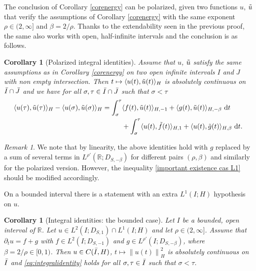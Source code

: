 \documentclass[11pt, letterpaper]{amsart}
\newtheorem{cor}[thm]{Corollary}
\theoremstyle{definition}
\theoremstyle{remark}
\newtheorem{rem}[thm]{Remark}
\numberwithin{equation}{section}
\begin{document}
{The conclusion of Corollary \ref{corenergy} can be polarized, given two functions $u$, $\Tilde{u}$ that verify the assumptions of Corollary \ref{corenergy} with the same exponent $\rho \in (2,\infty]$ and $\beta = 2/\rho$. Thanks to the extendability seen in the previous proof, the same also works with open, half-infinite intervals and the conclusion is as follows.
\begin{cor}[Polarized integral identities]\label{EnergyPol}
    Assume that $u$, $\Tilde{u}$ satisfy the same assumptions as in Corollary \ref{corenergy} on two open infinite intervals $I$ and $J$ with non empty intersection. Then $t \mapsto \langle u(t), \Tilde{u}(t) \rangle_H$ is absolutely continuous on $\Bar{I}\cap \Bar{J}$ and  we have for all $ \sigma, \tau \in \Bar{I}\cap \Bar{J}$ such that $  \sigma < \tau$
    \begin{align*}
        \langle u(\tau), \Tilde{u}(\tau) \rangle_H - \langle u(\sigma), \Tilde{u}(\sigma) \rangle_H =\int_{\sigma}^{\tau} &\langle f(t),\Tilde{u}(t)\rangle_{H,-1} + \langle g(t),\Tilde{u}(t)\rangle_{H,-{\beta}}\ \mathrm d t \\&+ \int_{\sigma}^{\tau} \langle u(t),\Tilde{f}(t)\rangle_{H,1} + \langle u(t), \Tilde{g}(t)\rangle_{H,{\beta}}\ \mathrm d t.
    \end{align*}
\end{cor} 

\begin{rem}
We note that by linearity, the above identities hold with $g$ replaced by a sum of several terms in $L^{\rho'}(\mathbb{R};D_{S,-{\beta}})$ for different pairs $(\rho,\beta)$ and similarly for the polarized version. However, the inequality \eqref{important existence cas L1} should be modified accordingly.
\end{rem}

On a bounded interval there is a statement with  an extra  $L^1(I;H)$ hypothesis on $u$.

\begin{cor}[Integral identities: the bounded case]\label{corenergybounded}
    Let $I$ be a  bounded, open interval of $\mathbb{R}$. Let $u \in L^2(I;D_{S,1})\cap L^1(I;H)$ and let $\rho \in (2,\infty]$. Assume that $\partial_t u =  f+g$ with $f \in L^2(I;D_{S,-1})$ and 
     $g \in L^{\rho'}(I;D_{S,-{\beta}})$, where ${\beta}={2}/{\rho} \in [0,1)$. Then $ u \in C(\Bar{I},H)$, $ t \mapsto \left \| u(t) \right \|^2_H$ is absolutely continuous on $\Bar{I}$ and \eqref{eq:integralidentity} holds for all $ \sigma, \tau \in \Bar{I}$ such that $  \sigma < \tau$.
\end{cor}

}
\end{document}
